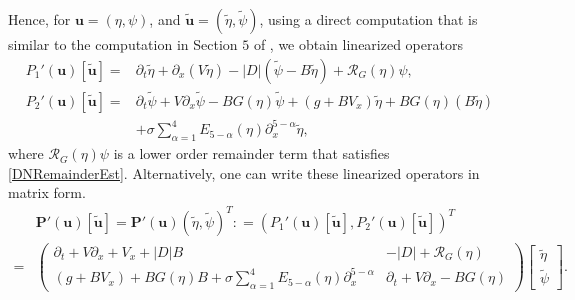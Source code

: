 \documentclass[12pt]{amsart}
\theoremstyle{remark}
\theoremstyle{definition}
\numberwithin{equation}{section}
\newcommand{\p}{\partial}
\newcommand{\al}{\alpha}
\begin{document}
Hence, for $\mathbf{u} = (\eta, \psi)$, and $\tilde{\mathbf{u}} = (\tilde{\eta}, \tilde{\psi})$, using a direct computation that is similar to the computation in Section $5$ of \cite{MR3356988}, we obtain linearized operators
\begin{align*}
P_1'(\mathbf{u})[\tilde{\mathbf{u}}] =& \p_t \tilde{\eta} + \p_x(V\tilde{\eta}) - |D|(\tilde{\psi} - B\tilde{\eta}) + \mathcal{R}_G(\eta)\psi, \\
P_2'(\mathbf{u})[\tilde{\mathbf{u}}] =& \p_t \tilde{\psi} + V\p_x\tilde{\psi} - BG(\eta)\tilde{\psi} + (g+ BV_x)\tilde{\eta} + BG(\eta)(B \tilde{\eta}) \\
& +  \sigma \sum _{\al = 1}^4 E_{5-\al}(\eta)\p_x^{5-\al}\tilde{\eta},
\end{align*}
where $\mathcal{R}_G(\eta)\psi$ is a lower order remainder term that satisfies \eqref{DNRemainderEst}.
Alternatively, one can write these linearized operators in matrix form. 
\begin{equation} \label{PuTildeu}
 \begin{aligned}
 &\mathbf{P}'(\mathbf{u})[\tilde{\mathbf{u}}] = \mathbf{P}'(\mathbf{u})(\tilde{\eta}, \tilde{\psi})^T : = (P_1'(\mathbf{u})[\tilde{\mathbf{u}}], P_2'(\mathbf{u})[\tilde{\mathbf{u}}])^T\\
 =&  \begin{pmatrix}
   \p_t + V\p_x +V_x + |D|B &   -|D|+ \mathcal{R}_G(\eta) \\
    (g+BV_x)+ BG(\eta)B + \sigma \sum _{\al = 1}^4 E_{5-\al}(\eta)\p_x^{5-\al}&  \p_t + V\p_x - BG(\eta) 
    \end{pmatrix} \begin{bmatrix} \tilde{\eta} \\
    \tilde{\psi} \end{bmatrix}.
 \end{aligned}
\end{equation}
\end{document}
